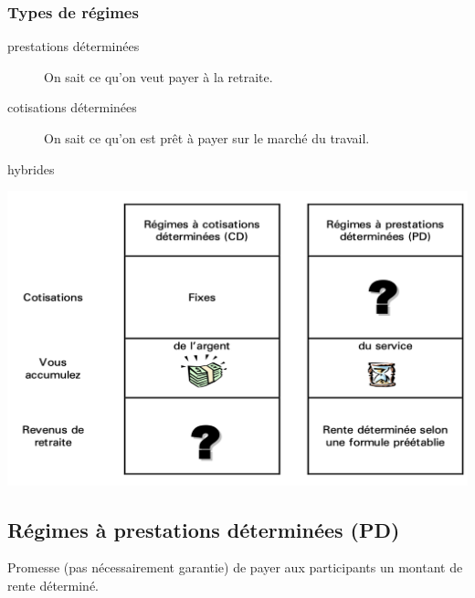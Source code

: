 \documentclass[10pt, french]{article}
\begin{document}
\begin{multicols*}{3}
\subsubsection*{Types de régimes}

\begin{description}
	\item[prestations déterminées]	On sait ce qu'on veut payer à la retraite.
	\item[cotisations déterminées]	On sait ce qu'on est prêt à payer sur le marché du travail.
	\item[hybrides]
\end{description}

\begin{center}
	\includegraphics[scale=0.33]{src/ACT-1005/CD-PD-table.png}
\end{center}

\columnbreak

\subsection*{Régimes à prestations déterminées (PD)}

\begin{definitionNOHFILL}[Description]
Promesse (pas nécessairement garantie) de payer aux participants un montant de rente déterminé.


\end{definitionNOHFILL}
\end{multicols*}
\end{document}

